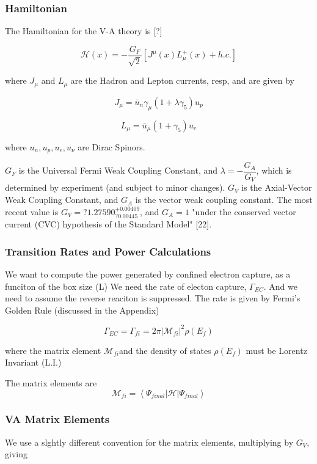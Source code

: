 \documentclass[11pt]{amsart}
\begin{document}
\subsubsection{Hamiltonian}

The Hamiltonian for the V-A theory is [?]

$$\mathcal{H}(x)=-\dfrac{G_{F}}{\sqrt{2}}\left[J^{\mu}(x)L^{+}_{\mu}(x)+h.c.\right]$$

where $J_{\mu}$ and $L_{\mu}$ are the Hadron and Lepton currents, resp, and are given by

$$J_{\mu}=\bar{u}_{n}\gamma_{\mu}(1+\lambda\gamma_{5})u_{p}$$

$$L_{\mu}=\bar{u}_{\mu}(1+\gamma_{5})u_{e}$$

where $u_{n},u_{p},u_{e},u_{\nu}$ are Dirac Spinors.

$G_{F}$ is the Universal Fermi Weak Coupling Constant, and $\lambda=-\dfrac{G_{A}}{G_{V}}$, which is determined by experiment (and subject to minor changes).  $G_{V}$ is the Axial-Vector Weak Coupling Constant, and $G_{A}$ is the vector weak coupling
constant.  The most recent value is $G_{V}=?1.27590^{+0.00409}_{?0.00445}$, and $G_{A}=1$ "under the conserved vector current (CVC) hypothesis of the Standard Model" [22].
 
\subsubsection{Transition Rates and Power Calculations}

We want to compute the power generated by confined electron capture, as a funciton of the box size (L)
We need the  rate of electon capture, $\Gamma_{EC}$.  And we need to assume the reverse reaciton is suppressed.  The rate is given by Fermi's Golden Rule (discussed in the Appendix)

$$\Gamma_{EC}=\Gamma_{fi}=2\pi|\mathcal{M}_{fi}|^{2}\rho(E_{f})$$

where the matrix element $\mathcal{M}_{fi}$and the density of states $\rho(E_{f})$ must be Lorentz Invariant (L.I.)

The matrix elements are 
$$\mathcal{M}_{fi}=\left<\Psi_{final}\big\vert\mathcal{H}\big\vert\Psi_{final}\right>$$


\subsubsection{VA Matrix Elements}

We use a slghtly different convention for the matrix elements, multiplying by $G_{V}$, giving
\end{document}
